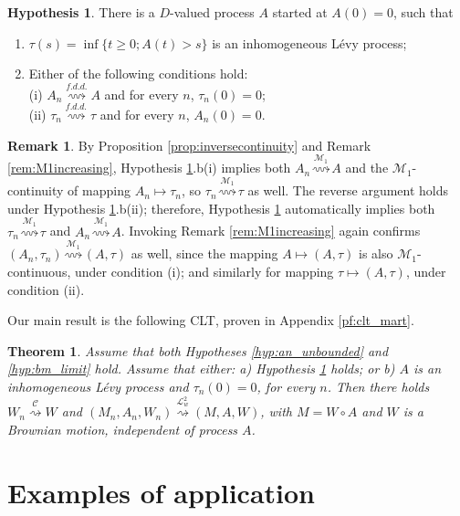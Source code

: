 \documentclass[final]{amsart}
\newtheorem{thm}{Theorem}[section]
\theoremstyle{definition}
\newtheorem{rem}{Remark}[section]
\newtheorem{hyp}{Hypothesis}[section]
\numberwithin{equation}{section}
\newcommand{\cL}{\ensuremath{\mathcal{L}}}
\begin{document}
\begin{hyp}\label{hyp:disc_disc1}
There is a $D$-valued process $A$ started at $A(0)=0$, such that
\begin{enumerate}
\item[(a)] $\tau(s) = \inf\{t\ge0; A(t)>s\}$ is an inhomogeneous L\'evy process;
\item[(b)] Either of the following conditions hold: \\
(i) $A_n \stackrel{f.d.d.}{\rightsquigarrow} A$ and for every $n$, $\tau_n(0)=0$; \\
(ii) $\tau_n \stackrel{f.d.d.}{\rightsquigarrow} \tau$ and for every $n$, $A_n(0)=0$.
\end{enumerate}
\end{hyp}

\begin{rem}\label{rem:jumps_tau}
By Proposition \ref{prop:inversecontinuity} and Remark \ref{rem:M1increasing}, Hypothesis \ref{hyp:disc_disc1}.b(i) implies both
$A_n \stackrel{\mathcal{M}_1}{\rightsquigarrow} A$ and the $\mathcal{M}_1$-continuity of mapping $A_n\mapsto\tau_n$,
so $\tau_n \stackrel{\mathcal{M}_1}{\rightsquigarrow} \tau$ as well.
The reverse argument holds under Hypothesis \ref{hyp:disc_disc1}.b(ii); therefore, Hypothesis \ref{hyp:disc_disc1} automatically
implies both $\tau_n \stackrel{\mathcal{M}_1}{\rightsquigarrow} \tau$ and $A_n \stackrel{\mathcal{M}_1}{\rightsquigarrow} A$.
Invoking Remark \ref{rem:M1increasing} again confirms $(A_n,\tau_n) \stackrel{\mathcal{M}_1}{\rightsquigarrow} (A,\tau)$ as well,
since the mapping $A\mapsto(A,\tau)$ is also $\mathcal{M}_1$-continuous, under condition (i); and similarly for mapping
$\tau\mapsto(A,\tau)$, under condition (ii).
\end{rem}

Our main result is the following CLT, proven in Appendix \ref{pf:clt_mart}.

\begin{thm}\label{thm:clt_mart}
Assume that both Hypotheses \ref{hyp:an_unbounded} and \ref{hyp:bm_limit} hold.
Assume that either: a) Hypothesis \ref{hyp:disc_disc1} holds;
or b) $A$ is an inhomogeneous L\'evy process and $\tau_n(0)=0$, for every $n$.
Then there holds $W_n \stackrel{\mathcal{C}}{\rightsquigarrow} W$ and
$(M_n,A_n,W_n) \stackrel{\cL^2_w}{\rightsquigarrow} (M,A,W)$,
with $M = W\circ A$ and $W$ is a Brownian motion, independent of process $A$.
\end{thm}



\section{Examples of application}\label{sec:ex}
\end{document}

